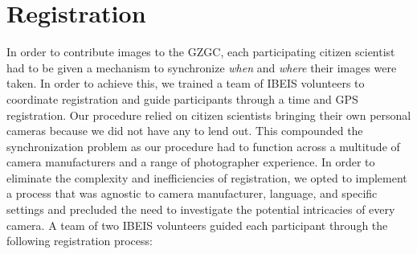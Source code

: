 \section{Registration}
In order to contribute images to the GZGC, each participating citizen scientist had to be given a mechanism to synchronize \textit{when} and \textit{where} their images were taken.  In order to achieve this, we trained a team of IBEIS volunteers to coordinate registration and guide participants through a time and GPS registration.  Our procedure relied on citizen scientists bringing their own personal cameras because we did not have any to lend out.  This compounded the synchronization problem as our procedure had to function across a multitude of camera manufacturers and a range of photographer experience.  In order to eliminate the complexity and inefficiencies of registration, we opted to implement a process that was agnostic to camera manufacturer, language, and specific settings and precluded the need to investigate the potential intricacies of every camera.  A team of two IBEIS volunteers guided each participant through the following registration process:

